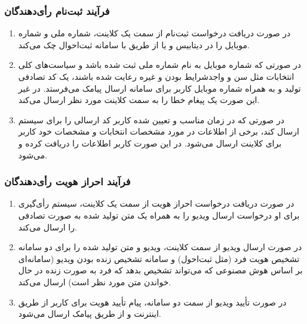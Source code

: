 \documentclass[12pt]{article}
\begin{document}
\subsubsection{فرآیند ثبت‌نام رأی‌دهندگان}
\begin{enumerate}[label=(\arabic*)]
\item
در صورت دریافت درخواست ثبت‌نام از سمت یک کلاینت، شماره ملی و شماره موبایل را در دیتابیس و یا از طریق    با سامانه ثبت‌احوال چک می‌کند.
\item
در صورتی که شماره موبایل به نام شماره ملی ثبت شده باشد و سیاست‌های کلی انتخابات مثل سن و واجدشرایط بودن و غیره رعایت شده باشند، یک کد 
تصادفی تولید و به همراه شماره موبایل کاربر برای سامانه ارسال پیامک می‌فرستد. در غیر این صورت یک پیغام خطا را به سمت کلاینت مورد نظر ارسال می‌کند. 
\item
در صورتی که در زمان مناسب و تعیین شده کاربر کد ارسالی را برای سیستم ارسال کند، برخی از اطلاعات در مورد مشخصات انتخابات و مشخصات خود کاربر برای کلاینت ارسال می‌شود. در این صورت کاربر اطلاعات را دریافت کرده و 
می‌شود. 
\end{enumerate}


\subsubsection{فرآیند احراز هویت رأی‌دهندگان}
\begin{enumerate}[label=(\arabic*)]
\item
در صورت دریافت درخواست احراز هویت از سمت یک کلاینت، سیستم رأی‌گیری برای او درخواست ارسال ویدیو را به همراه یک متن تولید شده به صورت تصادفی را ارسال می‌کند. 
\item
در صورت ارسال ویدیو از سمت کلاینت، ویدیو  و متن تولید شده را برای دو سامانه تشخیص هویت فرد (مثل ثبت‌احول) و سامانه تشخیص زنده بودن ویدیو (سامانه‌ای بر اساس هوش مصنوعی که می‌تواند تشخیص بدهد که فرد به صورت زنده در حال خواندن متن مورد نظر است) ارسال می‌کند. 
\item
در صورت تأیید ویدیو از سمت دو سامانه، پیام تأیید هویت برای کاربر از طریق اینترنت و از طریق پیامک ارسال می‌شود. 
\end{enumerate}
\end{document}

